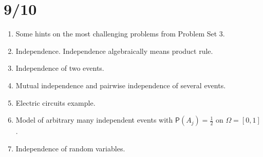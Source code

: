 \documentclass[letterpaper,11pt,oneside,reqno]{amsart}
\numberwithin{equation}{section}
\theoremstyle{definition}
\begin{document}
\section{9/10}

\begin{enumerate}
	\item Some hints on the most challenging problems from Problem Set 3.
	\item Independence. Independence algebraically means product rule.
	\item Independence of two events.
	\item Mutual independence and pairwise independence of several events.
	\item Electric circuits example.
	\item Model of 
		arbitrary many
		independent events with $\mathsf{P}(A_j)=\frac{1}{2}$ on $\Omega=[0,1]$.
	\item Independence of random variables.

\end{enumerate}
\end{document}
